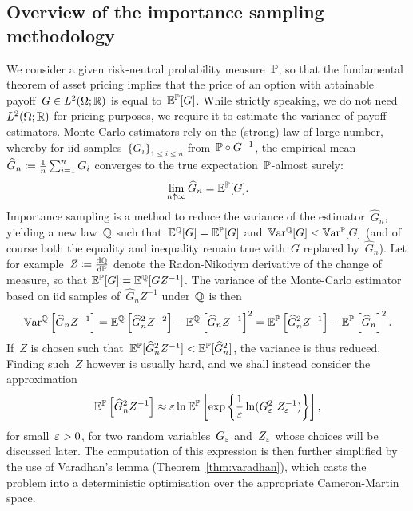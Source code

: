 \subsection{Overview of the importance sampling methodology}
We consider a given risk-neutral probability measure~$\mathbb{P}$, so that
the fundamental theorem of asset pricing
implies that the price of an option with  attainable payoff~$G\in L^2( \Omega;\mathbb{R})$ is equal to~$\mathbb{E}^{\mathbb{P}}[G]$. 
While strictly speaking, 
we do not need~$L^2(\Omega;\mathbb{R})$ for pricing purposes, we require it to estimate the variance of payoff estimators.
Monte-Carlo estimators rely on the (strong) law of large number, whereby for iid samples~$\{G_{i}\}_{1\leq i \leq n}$ from~$\mathbb{P} \circ G^{-1}$, 
the empirical mean~$\widehat{G}_n \coloneqq\frac{1}{n}\sum_{i=1}^{n}G_i$
converges to the true expectation~$\mathbb{P}$-almost surely:
$$
\lim_{n\uparrow \infty}\widehat{G}_n = \mathbb{E}^{\mathbb{P}}[G].
$$
Importance sampling is a method to reduce the variance of the estimator~$\widehat{G}_n$, yielding a new law~$\mathbb{Q}$ such that~$\mathbb{E}^{\mathbb{Q}}[G] = \mathbb{E}^{\mathbb{P}}[G]$
and~$ \mathbb{V}\mathrm{ar}^{\mathbb{Q}}[G] <  \mathbb{V}\mathrm{ar}^{\mathbb{P}}[G]$
(and of course both the equality and inequality remain true with~$G$ replaced by~$\widehat{G}_n$).
Let for example~$Z \coloneqq \frac{\mathrm{d}\mathbb{Q}}{\mathrm{d}\mathbb{P}}$ denote the Radon-Nikodym derivative of the change of measure, so that
$\mathbb{E}^{\mathbb{P}}[G] = \mathbb{E}^{\mathbb{Q}}[G Z^{-1}]$.								 
The variance of the Monte-Carlo estimator based on iid samples of~$\widehat{G}_n Z^{-1}$ under~$\mathbb{Q}$ is then
$$
 \mathbb{V}\mathrm{ar}^{\mathbb{Q}}\left[\widehat{G}_n Z^{-1}\right] 
 = \mathbb{E}^{\mathbb{Q}}\left[\widehat{G}_n^2 Z^{-2}\right]  - \mathbb{E}^{\mathbb{Q}}\left[\widehat{G}_n Z^{-1}\right]^2
 = \mathbb{E}^{\mathbb{P}}\left[\widehat{G}_n^2 Z^{-1}\right]  - \mathbb{E}^{\mathbb{P}}\left[\widehat{G}_n\right]^2.
$$
If~$Z$ is chosen such that~$\mathbb{E}^{\mathbb{P}}[\widehat{G}_n^2 Z^{-1}] < \mathbb{E}^{\mathbb{P}}[\widehat{G}_n^2]$, 
the variance is thus reduced.
Finding such~$Z$ however is usually hard, and  
we shall instead consider the approximation
\begin{equation}\label{eq:proxy}
\EE^{\PP}\left[\widehat{G}_n^2 Z^{-1}\right]
\approx \eps\ln \EE^{\PP}\left[\exp\left\{\frac{1}{\eps}\ln(G_{\eps}^2 \ Z_{\eps}^{-1})\right\}\right], 
\end{equation}
for small~$\varepsilon>0$, for two random variables~$G_{\varepsilon}$ and~$Z_{\varepsilon}$ whose choices will be discussed later.
The computation of this expression is then further simplified by the use of Varadhan's lemma (Theorem~\ref{thm:varadhan}), which casts the problem into a deterministic optimisation over the appropriate Cameron-Martin space.

